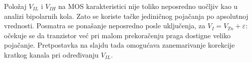 Položaj $V_{IL}$ i $V_{IH}$ na MOS karakteristici nije toliko neposredno uočljiv kao u analizi bipolarnih kola. Zato se koriste tačke jediničnog pojačanja po apsolutnoj vrednosti. Posmatra se ponašanje neposredno posle uključenja, za $V_I=V_{Tn}+\varepsilon$: očekuje se da tranzistor već pri malom prekoračenju praga dostigne veliko pojačanje. Pretpostavka na slajdu tada omogućava zanemarivanje korekcije kratkog kanala pri određivanju $V_{IL}$.
